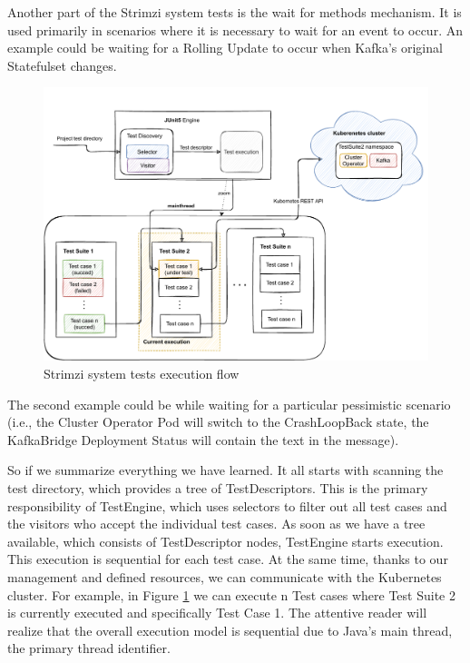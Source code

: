Another part of the Strimzi system tests is the wait for methods mechanism.
It is used primarily in scenarios where it is necessary to wait for an event to occur.
An example could be waiting for a Rolling Update to occur when Kafka's original Statefulset changes. \begin{figure}[!ht]
    \centering
    \includegraphics[scale=0.70]{obrazky-figures/02-preliminaries/04-strimzi-system-tests/02d-strimzisystemtest-sequence-execution.pdf}
    \caption{Strimzi system tests execution flow}
    \label{02d:fig:strimzisysmtetest:execution}
\end{figure}
The second example could be while waiting for a particular pessimistic scenario (i.e., the Cluster Operator Pod will switch to the CrashLoopBack state, the KafkaBridge Deployment Status will contain the text in the message).

So if we summarize everything we have learned.
It all starts with scanning the test directory, which provides a tree of TestDescriptors.
This is the primary responsibility of TestEngine, which uses selectors to filter out all test cases and the visitors who accept the individual test cases.
As soon as we have a tree available, which consists of TestDescriptor nodes, TestEngine starts execution.
This execution is sequential for each test case.
At the same time, thanks to our management and defined resources, we can communicate with the Kubernetes cluster.
For example, in Figure \ref{02d:fig:strimzisysmtetest:execution} we can execute n Test cases where Test Suite 2 is currently executed and specifically Test Case 1.
The attentive reader will realize that the overall execution model is sequential due to Java's main thread, the primary thread identifier.